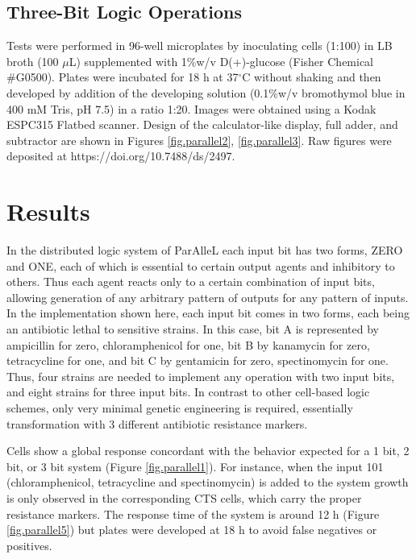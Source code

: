 \subsection{Three-Bit Logic Operations}

Tests were performed in 96-well microplates by inoculating cells (1:100) in LB broth (100 $\mu$L) supplemented with 1\%w/v D(+)-glucose (Fisher Chemical \#G0500). Plates were incubated for 18 h at 37$^{\circ}$C without shaking and then developed by addition of the developing solution (0.1\%w/v bromothymol blue in 400 mM Tris, pH 7.5) in a ratio 1:20. Images were obtained using a Kodak ESPC315 Flatbed scanner. Design of the calculator-like display, full adder, and subtractor are shown in Figures \ref{fig.parallel2}, \ref{fig.parallel3}. Raw figures were deposited at https://doi.org/10.7488/ds/2497.

\section{Results}

In the distributed logic system of ParAlleL each input bit has two forms, ZERO and ONE, each of which is essential to certain output agents and inhibitory to others. Thus each agent reacts only to a certain combination of input bits, allowing generation of any arbitrary pattern of outputs for any pattern of inputs. In the implementation shown here, each input bit comes in two forms, each being an antibiotic lethal to sensitive strains. In this case, bit A is represented by ampicillin for zero, chloramphenicol for one, bit B by kanamycin for zero, tetracycline for one, and bit C by gentamicin for zero, spectinomycin for one. Thus, four strains are needed to implement any operation with two input bits, and eight strains for three input bits. In contrast to other cell-based logic schemes, only very minimal genetic engineering is required, essentially transformation with 3 different antibiotic resistance markers.

Cells show a global response concordant with the behavior expected for a 1 bit, 2 bit, or 3 bit system (Figure \ref{fig.parallel1}). For instance, when the input 101 (chloramphenicol, tetracycline and spectinomycin) is added to the system growth is only observed in the corresponding CTS cells, which carry the proper resistance markers. The response time of the system is around 12 h (Figure \ref{fig.parallel5}) but plates were developed at 18 h to avoid false negatives or positives.

